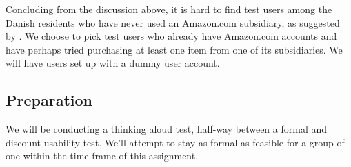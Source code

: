 Concluding from the discussion above, it is hard to find test users among the
Danish residents who have never used an Amazon.com subsidiary, as suggested by
\cite{molich}. We choose to pick test users who already have Amazon.com
accounts and have perhaps tried purchasing at least one item from one of its
subsidiaries. We will have users set up with a dummy user account.

















% 

\subsection{Preparation}

We will be conducting a thinking aloud test, half-way between a formal and
discount usability test. We'll attempt to stay as formal as feasible for a
group of one within the time frame of this assignment.

